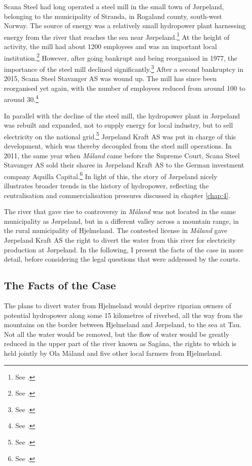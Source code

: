 Scana Steel had long operated a steel mill in the small town of Jørpeland, belonging to the municipality of Stranda, in Rogaland county, south-west Norway. The source of energy was a relatively small hydropower plant harnessing energy from the river that reaches the sea near Jørpeland.\footnote{See \cite{aadland09}.} At the height of activity, the mill had about 1200 employees and was an important local institution.\footnote{See \cite[11]{meland82}.} However, after going bankrupt and being reorganised in 1977, the importance of the steel mill declined significantly.\footnote{See \cite[8-15]{meland82}.} After a second bankruptcy in 2015, Scana Steel Stavanger AS was wound up. The mill has since been reorganised yet again, with the number of employees reduced from around 100 to around 30.\footnote{See \cite{jossang15}.}

In parallel with the decline of the steel mill, the hydropower plant in Jørpeland was rebuilt and expanded, not to supply energy for local industry, but to sell electricity on the national grid.\footnote{See \cite{aadland09}.} Jørpeland Kraft AS was put in charge of this development, which was thereby decoupled from the steel mill operations. In 2011, the same year when {\it Måland} came before the Supreme Court, Scana Steel Stavanger AS sold their shares in Jørpeland Kraft AS to the German investment company Aquilla Capital.\footnote{See \cite{sandvik11}.} In light of this, the story of Jørpeland nicely illustrates broader trends in the history of hydropower, reflecting the centralisation and commercialisation pressures discussed in chapter \ref{chap:4}.

The river that gave rise to controversy in {\it Måland} was not located in the same municipality as Jørpeland, but in a different valley across a mountain range, in the rural municipality of Hjelmeland. The contested license in {\it Måland} gave Jørpeland Kraft AS the right to divert the water from this river for electricity production at Jørpeland. In the following, I present the facts of the case in more detail, before considering the legal questions that were addressed by the courts.

\subsection{The Facts of the Case}\label{sec:5:6:1}

The plans to divert water from Hjelmeland would deprive riparian owners of potential hydropower along some 15 kilometres of riverbed, all the way from the mountains on the border between Hjelmeland and Jørpeland, to the sea at Tau. Not all the water would be removed, but the flow of water would be greatly reduced in the upper part of the river known as Sagåna, the rights to which is held jointly by Ola Måland and five other local farmers from Hjelmeland.

